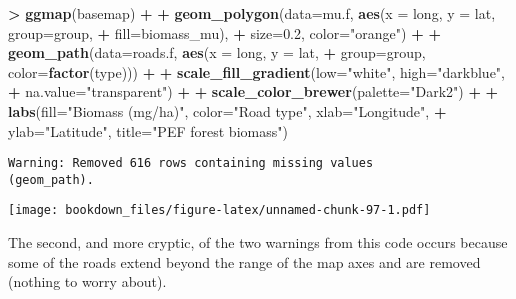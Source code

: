 \documentclass[]{krantz}
\makeatletter
\newenvironment{Shaded}{\begin{snugshade}}{\end{snugshade}}
\newcommand{\KeywordTok}[1]{\textcolor[rgb]{0.27,0.27,0.27}{\textbf{#1}}}
\newcommand{\DataTypeTok}[1]{\textcolor[rgb]{0.27,0.27,0.27}{#1}}
\newcommand{\FloatTok}[1]{\textcolor[rgb]{0.06,0.06,0.06}{#1}}
\newcommand{\StringTok}[1]{\textcolor[rgb]{0.5,0.5,0.5}{#1}}
\newcommand{\OperatorTok}[1]{\textcolor[rgb]{0.43,0.43,0.43}{\textbf{#1}}}
\newcommand{\NormalTok}[1]{#1}
\newenvironment{kframe}{%
\medskip{}
\setlength{\fboxsep}{.8em}
 \def\at@end@of@kframe{}%
 \ifinner\ifhmode%
  \def\at@end@of@kframe{\end{minipage}}%
  \begin{minipage}{\columnwidth}%
 \fi\fi%
 \def\FrameCommand##1{\hskip\@totalleftmargin \hskip-\fboxsep
 \colorbox{shadecolor}{##1}\hskip-\fboxsep
     \hskip-\linewidth \hskip-\@totalleftmargin \hskip\columnwidth}%
 \MakeFramed {\advance\hsize-\width
   \@totalleftmargin\z@ \linewidth\hsize
   \@setminipage}}%
 {\par\unskip\endMakeFramed%
 \at@end@of@kframe}
\renewenvironment{Shaded}{\begin{kframe}}{\end{kframe}}
\theoremstyle{definition}
\theoremstyle{definition}
\theoremstyle{definition}
\theoremstyle{remark}
\makeatother
\begin{document}
\begin{Shaded}
\begin{Highlighting}[]
\OperatorTok{>}\StringTok{ }\KeywordTok{ggmap}\NormalTok{(basemap) }\OperatorTok{+}
\OperatorTok{+}\StringTok{     }\KeywordTok{geom_polygon}\NormalTok{(}\DataTypeTok{data=}\NormalTok{mu.f, }\KeywordTok{aes}\NormalTok{(}\DataTypeTok{x =}\NormalTok{ long, }\DataTypeTok{y =}\NormalTok{ lat, }\DataTypeTok{group=}\NormalTok{group, }
\OperatorTok{+}\StringTok{                                 }\DataTypeTok{fill=}\NormalTok{biomass_mu), }
\OperatorTok{+}\StringTok{                  }\DataTypeTok{size=}\FloatTok{0.2}\NormalTok{, }\DataTypeTok{color=}\StringTok{"orange"}\NormalTok{) }\OperatorTok{+}
\OperatorTok{+}\StringTok{     }\KeywordTok{geom_path}\NormalTok{(}\DataTypeTok{data=}\NormalTok{roads.f, }\KeywordTok{aes}\NormalTok{(}\DataTypeTok{x =}\NormalTok{ long, }\DataTypeTok{y =}\NormalTok{ lat, }
\OperatorTok{+}\StringTok{                                 }\DataTypeTok{group=}\NormalTok{group, }\DataTypeTok{color=}\KeywordTok{factor}\NormalTok{(type))) }\OperatorTok{+}
\OperatorTok{+}\StringTok{     }\KeywordTok{scale_fill_gradient}\NormalTok{(}\DataTypeTok{low=}\StringTok{"white"}\NormalTok{, }\DataTypeTok{high=}\StringTok{"darkblue"}\NormalTok{, }
\OperatorTok{+}\StringTok{                         }\DataTypeTok{na.value=}\StringTok{"transparent"}\NormalTok{) }\OperatorTok{+}
\OperatorTok{+}\StringTok{     }\KeywordTok{scale_color_brewer}\NormalTok{(}\DataTypeTok{palette=}\StringTok{"Dark2"}\NormalTok{) }\OperatorTok{+}
\OperatorTok{+}\StringTok{     }\KeywordTok{labs}\NormalTok{(}\DataTypeTok{fill=}\StringTok{"Biomass (mg/ha)"}\NormalTok{, }\DataTypeTok{color=}\StringTok{"Road type"}\NormalTok{, }\DataTypeTok{xlab=}\StringTok{"Longitude"}\NormalTok{, }
\OperatorTok{+}\StringTok{          }\DataTypeTok{ylab=}\StringTok{"Latitude"}\NormalTok{, }\DataTypeTok{title=}\StringTok{"PEF forest biomass"}\NormalTok{)}
\end{Highlighting}
\end{Shaded}

\begin{verbatim}
Warning: Removed 616 rows containing missing values
(geom_path).
\end{verbatim}

\texttt{[image: bookdown\_files/figure-latex/unnamed-chunk-97-1.pdf]}

The second, and more cryptic, of the two warnings from this code occurs
because some of the roads extend beyond the range of the map axes and
are removed (nothing to worry about).
\end{document}
